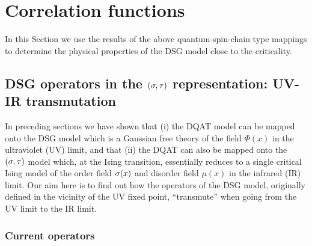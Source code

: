 \section{Correlation functions}
\label{corf}

In this Section we use the results of the above
quantum-spin-chain type mappings to determine the
physical properties of the DSG model close to
the criticality. 

\subsection{DSG operators in 
the $(\sigma,\tau)$ representation: UV-IR transmutation}

In preceding sections we have shown that (i) the DQAT
model can be mapped onto the DSG model which is a Gaussian
free theory of the field $\Phi(x)$ in the ultraviolet
(UV) limit, and that (ii) the DQAT can also be 
mapped onto the $(\sigma,\tau)$ model which, at the Ising 
transition,
essentially reduces to a single critical Ising model
of the order field $\sigma(x)$ and disorder field
$\mu(x)$
in the infrared (IR) limit. Our aim here is to find out 
how the operators of the DSG model, originally defined in the 
vicinity of the UV fixed point, ``transmute'' when going from the
UV limit to the IR limit.



\subsubsection{Current operators}


